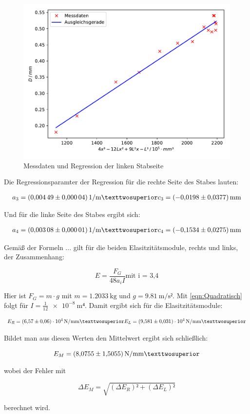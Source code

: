 \begin{figure}
  \centering
  \includegraphics[scale=0.8]{content/plot4.pdf}
  \caption{Messdaten und Regression der linken Stabseite}
  \label{fig:plot4}
\end{figure}

Die Regressionsparamter der Regression für die rechte Seite des Stabes
lauten:

\begin{align*}
a_3 = \SI{0.00449+-0.00004}{1\per\meter²}
c_3 = \SI{-0.0198+-0.0377}{\milli\meter}
\end{align*}

Und für die linke Seite des Stabes ergibt sich: 

\begin{align*}
a_4 = \SI{0.00308+-0.00001}{1\per\meter²}
c_4 = \SI{-0.1534+-0.0275}{\milli\meter}
\end{align*}

Gemäß der Formeln ... gilt für die beiden Elasitzitätsmodule, rechts und links, 
der Zusammenhang: 

\begin{equation*}
E = \frac{F_G}{48a_iI} \text{mit i = 3,4}
\end{equation*}

Hier ist $F_G = m\cdot g$ mit $m = \SI{1.2033}{\kilo\gram}$ und $g = \SI{9.81}{\meter\per\second²}$.
Mit \eqref{eqn:Quadratisch} folgt für $I = \frac{1}{12}\SI{e-8}{\meter⁴}$. Damit 
ergibt sich für die Elasitzitätsmodule: 

\begin{align*}
E_R = \SI{6.57+-0.06e4}{\newton\per\milli\meter²}
E_L = \SI{9.581+-0.031e4}{\newton\per\milli\meter²}
\end{align*}

Bildet man aus diesen Werten den Mittelwert ergibt sich schließlich: 

\begin{equation*}
E_M = \SI{8.0755+-1.5055}{\newton\per\milli\meter²}
\end{equation*}

wobei der Fehler mit 

\begin{equation*}
\Delta E_M = \sqrt{(\Delta E_R)²+(\Delta E_L)²}
\end{equation*}

berechnet wird.